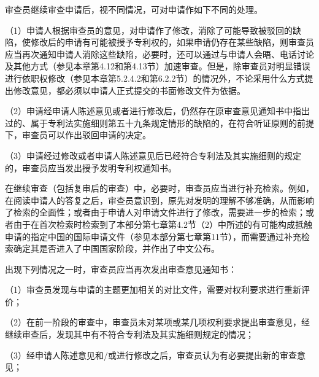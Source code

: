审查员继续审查申请后，视不同情况，可对申请作如下不同的处理。

{\setlength{\parindent}{17.1bp}（1）申请人根据审查员的意见，对申请作了修改，消除了可能导致被驳回的缺陷，使修改后的申请有可能被授予专利权的，如果申请仍存在某些缺陷，则审查员应当再次通知申请人消除这些缺陷，必要时，还可以通过与申请人会晤、电话讨论及其他方式（参见本章第4.12和第4.13节）加速审查。但是，除审查员对明显错误进行依职权修改（参见本章第5.2.4.2和第6.2.2节）的情况外，不论采用什么方式提出修改意见，都必须以申请人正式提交的书面修改文件为依据。\par}

{\setlength{\parindent}{17.1bp}（2）申请经申请人陈述意见或者进行修改后，仍然存在原审查意见通知书中指出过的、属于专利法实施细则第五十九条规定情形的缺陷的，在符合听证原则的前提下，审查员可以作出驳回申请的决定。\par}

{\setlength{\parindent}{17.1bp}（3）申请经过修改或者申请人陈述意见后已经符合专利法及其实施细则的规定的，审查员应当发出授予发明专利权通知书。\par}

在继续审查（包括复审后的审查）中，必要时，审查员应当进行补充检索。例如，在阅读申请人的答复之后，审查员意识到，原先对发明的理解不够准确，从而影响了检索的全面性；或者由于申请人对申请文件进行了修改，需要进一步的检索；或者由于在首次检索时检索到了本部分第七章第4.2节（2）中所述的有可能构成抵触申请的指定中国的国际申请文件（参见本部分第七章第11节），而需要通过补充检索确定其是否进入了中国国家阶段，并作出了中文公布。

出现下列情况之一时，审查员应当再次发出审查意见通知书：

{\setlength{\parindent}{17.1bp}（1）审查员发现与申请的主题更加相关的对比文件，需要对权利要求进行重新评价；\par}

{\setlength{\parindent}{17.1bp}（2）在前一阶段的审查中，审查员未对某项或某几项权利要求提出审查意见，经继续审查后，发现其中有不符合专利法及其实施细则规定的情况；\par}

{\setlength{\parindent}{17.1bp}（3）经申请人陈述意见和/或进行修改之后，审查员认为有必要提出新的审查意见；\par}

